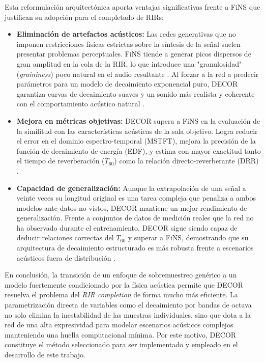 Esta reformulación arquitectónica aporta ventajas significativas frente a FiNS que justifican su adopción para el completado de RIRs:

\begin{itemize}
    
    \item \textbf{Eliminación de artefactos acústicos:} Las redes generativas que no imponen restricciones físicas estrictas sobre la síntesis de la señal suelen presentar problemas perceptuales. FiNS tiende a generar picos dispersos de gran amplitud en la cola de la RIR, lo que introduce una "granulosidad" (\textit{graininess}) poco natural en el audio resultante \cite{Steinmetz2021FiNS,Lin25}. Al forzar a la red a predecir parámetros para un modelo de decaimiento exponencial puro, DECOR garantiza curvas de decaimiento suaves y un sonido más realista y coherente con el comportamiento acústico natural \cite{Lin25}.
    
    \item \textbf{Mejora en métricas objetivas:} DECOR supera a FiNS en la evaluación de la similitud con las características acústicas de la sala objetivo. Logra reducir el error en el dominio espectro-temporal (MSTFT), mejora la precisión de la función de decaimiento de energía (EDF), y estima con mayor exactitud tanto el tiempo de reverberación ($T_{60}$) como la relación directo-reverberante (DRR) \cite{Lin25}. 
    
    \item \textbf{Capacidad de generalización:} Aunque la extrapolación de una señal a veinte veces su longitud original es una tarea compleja que penaliza a ambos modelos ante datos no vistos, DECOR mantiene un mejor rendimiento de generalización. Frente a conjuntos de datos de medición reales que la red no ha observado durante el entrenamiento, DECOR sigue siendo capaz de deducir relaciones correctas del $T_{60}$ y superar a FiNS, demostrando que su arquitectura de decaimiento estructurado es más robusta frente a escenarios acústicos fuera de distribución \cite{Lin25}.
\end{itemize}

En conclusión, la transición de un enfoque de sobremuestreo genérico a un modelo fuertemente condicionado por la física acústica permite que DECOR resuelva el problema del \textit{RIR completion} de forma mucho más eficiente. La parametrización directa de variables como el decaimiento por bandas de octava no solo elimina la inestabilidad de las muestras individuales, sino que dota a la red de una alta expresividad para modelar escenarios acústicos complejos manteniendo una huella computacional mínima. Por este motivo, DECOR constituye el método seleccionado para ser implementado y empleado en el desarrollo de este trabajo.

